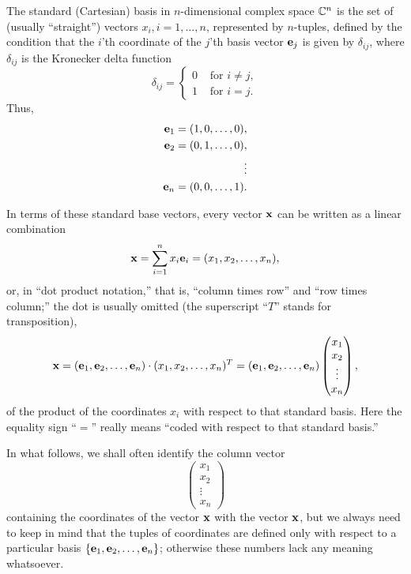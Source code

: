 The standard (Cartesian) basis in $n$-dimensional complex space ${\Bbb C}^n$
is the set of (usually ``straight'')
vectors $x_i, i=1, \ldots , n$, represented by $n$-tuples,
defined by the condition that the $i$'th coordinate of the $j$'th basis vector
${\bf e}_j$ is given by $\delta_{ij}$, where $\delta_{ij}$ is the Kronecker delta function
\begin{equation}
\delta_{ij} =\begin{cases}
0  &\text{ for }i\neq j , \\
1  &\text{ for }i = j.
\end{cases}
\end{equation}
Thus,
\begin{equation}
\begin{split}
{\bf e}_1=(1,0,\ldots,0),\\
{\bf e}_2=(0,1,\ldots,0),\\
\vdots\\
{\bf e}_n=(0,0,\ldots,1).
\end{split}
\end{equation}


In terms of these standard base vectors, every vector ${\bf x}$
can be written as a linear combination
\begin{equation}
{\bf x} = \sum_{i=1}^n x_i{\bf e}_i = (x_1,x_2, \ldots , x_n),
\end{equation}
or, in ``dot product notation,''
that is,
``column times row''
and
``row times column;'' the dot is usually omitted (the superscript ``$T$'' stands for transposition),
\begin{equation}
{\bf x} = ({\bf e}_1,{\bf e}_2, \ldots , {\bf e}_n)
\cdot
(x_1,x_2, \ldots , x_n)^T
=
({\bf e}_1,{\bf e}_2, \ldots , {\bf e}_n)
\begin{pmatrix}
x_1\\x_2\\ \vdots \\ x_n
\end{pmatrix}
,
\end{equation}
of the product of the coordinates $x_i$  with respect to that standard basis.
Here the equality sign ``$=$'' really means ``coded with respect to that standard basis.''

In what follows, we shall often identify the column vector
$$
\begin{pmatrix}
x_1\\x_2\\ \vdots \\ x_n
\end{pmatrix}
$$
containing the coordinates of the vector ${\bf x}$
with the vector ${\bf x}$, but we always need to keep in mind that
the tuples of coordinates are defined only with respect to a particular basis
$\{ {\bf e}_1,{\bf e}_2, \ldots , {\bf e}_n \}$; otherwise these numbers lack any meaning whatsoever.

